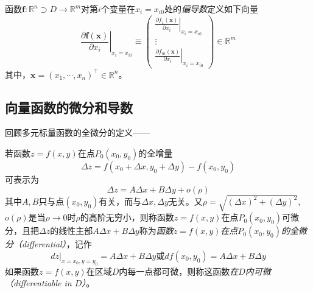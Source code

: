 \documentclass[../main.tex]{subfiles}
\begin{document}
\begin{definition}[向量函数的偏导数]\label{def:II.4.11}
    函数$\mathbf{f}:\mathbb{R}^n\supset D\rightarrow\mathbb{R}^m$对第$i$个变量在$x_i=x_{i0}$处的\emph{偏导数}定义如下向量
    \[
        \left.\frac{\partial \mathbf{f}\left(\mathbf{x}\right)}{\partial x_i}\right|_{x_i=x_{i0}}\equiv\left(\begin{array}{c}
                \left.\frac{\partial f_1\left(\mathbf{x}\right)}{\partial x_i}\right|_{x_i=x_{i0}} \\
                \vdots                                                                             \\
                \left.\frac{\partial f_m\left(\mathbf{x}\right)}{\partial x_i}\right|_{x_i=x_{i0}}\end{array}\right)\in\mathbb{R}^m
    \]
    其中，$\mathbf{x}=\left(x_1,\cdots,x_n\right)^\intercal\in\mathbb{R}^n$。
\end{definition}


\subsection{向量函数的微分和导数}
回顾多元标量函数的全微分的定义\cite[“定义7.3.1”,p.~19]{华工高数2009下}——

\begin{definition}[多元标量值函数的微分]\label{def:II.4.12}
    若函数$z=f\left(x,y\right)$在点$P_0\left(x_0,y_0\right)$的全增量
    \[
        \Delta z=f\left(x_0+\Delta x,y_0+\Delta y\right)-f\left(x_0,y_0\right)
    \]
    可表示为
    \[
        \Delta z=A \Delta x+ B \Delta y+o\left(\rho\right)
    \]
    其中$A,B$只与点$\left(x_0,y_0\right)$有关，而与$\Delta x,\Delta y$无关。又$\rho=\sqrt{\left(\Delta x\right)^2+\left(\Delta y\right)^2}$,$o\left(\rho\right)$是当$\rho\rightarrow 0$时$\rho$的高阶无穷小，则称函数$z=f\left(x,y\right)$在点$P_0\left(x_0,y_0\right)$可微分，且把$\Delta z$的线性主部$A\Delta x+B\Delta y$称为\emph{函数$z=f\left(x,y\right)$在点$P_0\left(x_0,y_0\right)$的全微分（differential）}，记作
    \[
        \left.dz\right|_{x=x_0,y=y_0}=A\Delta x+B\Delta y\text{或}df\left(x_0,y_0\right)=A\Delta x+B\Delta y
    \]
    如果函数$z=f\left(x,y\right)$在区域$D$内每一点都可微，则称这函数\emph{在$D$内可微（differentiable in $D$）}。
\end{definition}
\end{document}
